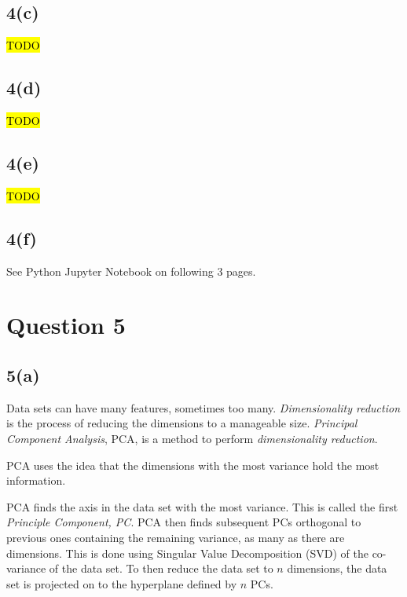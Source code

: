 \documentclass[12pt, a4paper,reqno]{article}
\begin{document}
\subsection*{4(c)}
\hl{TODO}

\subsection*{4(d)}
\hl{TODO}

\subsection*{4(e)}
\hl{TODO}

\subsection*{4(f)}
See Python Jupyter Notebook on following 3 pages.




%
%
\clearpage\section*{Question 5}

\subsection*{5(a)}

Data sets can have many features, sometimes too many. \emph{Dimensionality reduction} is the process of reducing the dimensions to a manageable size. \emph{Principal Component Analysis}, PCA, is a method to perform \emph{dimensionality reduction}.

PCA uses the idea that the dimensions with the most variance hold the most information.

PCA finds the axis in the data set with the most variance. This is called the first \emph{Principle Component, PC}. PCA then finds subsequent PCs orthogonal to previous ones containing the remaining variance, as many as there are dimensions. This is done using Singular Value Decomposition (SVD) of the co-variance of the data set. To then reduce the data set to $n$ dimensions, the data set is projected on to the hyperplane defined by $n$ PCs.
\end{document}
